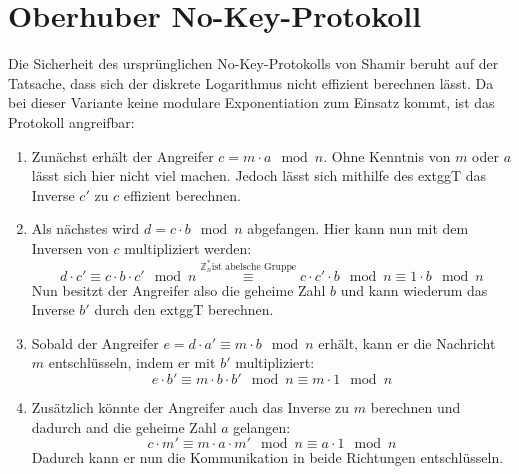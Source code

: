 \documentclass[DIN, pagenumber=false, fontsize=11pt, parskip=half]{scrartcl}
\newcommand{\Z}[0]{\mathbb{Z}}
\newcommand{\congTo}[2]{\equiv #1\mod #2}
\begin{document}
\section{Oberhuber No-Key-Protokoll}
Die Sicherheit des ursprünglichen No-Key-Protokolls von Shamir beruht auf der Tatsache, dass sich der diskrete Logarithmus nicht effizient berechnen lässt. Da bei dieser
Variante keine modulare Exponentiation zum Einsatz kommt, ist das Protokoll angreifbar:
\begin{enumerate}
    \item Zunächst erhält der Angreifer $c = m \cdot a \mod n$. Ohne Kenntnis von $m$ oder $a$ lässt sich hier nicht viel machen. Jedoch lässt sich mithilfe des extggT
          das Inverse $c'$ zu $c$ effizient berechnen.
    \item Als nächstes wird $d = c \cdot b \mod n$ abgefangen. Hier kann nun mit dem Inversen von $c$ multipliziert werden:
          \begin{equation*}
              d \cdot c' \congTo{c \cdot b \cdot c'}{n} \stackrel{\Z^*_n \text{ist abelsche Gruppe}}{\equiv} c \cdot c' \cdot b \mod n \congTo{1 \cdot b}{n}
          \end{equation*}
          Nun besitzt der Angreifer also die geheime Zahl $b$ und kann wiederum das Inverse $b'$ durch den extggT berechnen.
    \item Sobald der Angreifer $e = d \cdot a' \congTo{m \cdot b}{n}$ erhält, kann er die Nachricht $m$ entschlüsseln, indem er mit $b'$ multipliziert:
          \begin{equation*}
              e \cdot b' \congTo{m \cdot b \cdot b'}{n} \congTo{m \cdot 1}{n}
          \end{equation*}
    \item Zusätzlich könnte der Angreifer auch das Inverse zu $m$ berechnen und dadurch and die geheime Zahl $a$ gelangen:
          \begin{equation*}
              c \cdot m' \congTo{m \cdot a \cdot m'}{n} \congTo{a \cdot 1}{n}
          \end{equation*}
          Dadurch kann er nun die Kommunikation in beide Richtungen entschlüsseln.
\end{enumerate}
\end{document}
